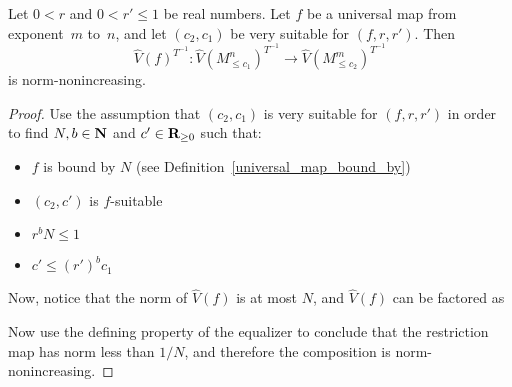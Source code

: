 \begin{lemma}
  \label{eval_CLCFPTinv_norm_noninc}
  \leanok
  Let $0 < r$ and $0 < r' \le 1$ be real numbers.
  Let $f$ be a universal map from exponent~$m$ to~$n$,
  and let $(c_2, c_1)$ be very suitable for $(f, r, r')$.
  Then
  \[
    \hat V(f)^{T^{-1}} \colon \hat V(M_{\le c_1}^n)^{T^{-1}} \to \hat V(M_{\le c_2}^m)^{T^{-1}}
  \]
  is norm-nonincreasing.
\end{lemma}

\begin{proof}
  \leanok
  Use the assumption that $(c_2, c_1)$ is very suitable for $(f, r, r')$
  in order to find $N, b \in \mathbf{N}$ and $c' \in \mathbf{R}_{\ge 0}$ such that:
  \begin{itemize}
    \item $f$ is bound by $N$ (see Definition~\ref{universal_map_bound_by})
    \item $(c_2, c')$ is $f$-suitable
    \item $r ^ b N ≤ 1$
    \item $c' ≤ (r') ^ b c_1$
  \end{itemize}
  Now, notice that the norm of $\hat V(f)$ is at most $N$,
  and $\hat V(f)$ can be factored as
  \begin{center}
  \end{center}
  Now use the defining property of the equalizer to conclude that
  the restriction map has norm less than $1/N$,
  and therefore the composition is norm-nonincreasing.
\end{proof}

